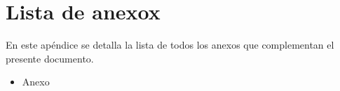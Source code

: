 \chapter{Lista de anexox}
\label{listaanexos}
En este apéndice se detalla la lista de todos los anexos que complementan el presente documento.
\citationneeded[TODO]
\begin{itemize}
\item Anexo
\end{itemize}